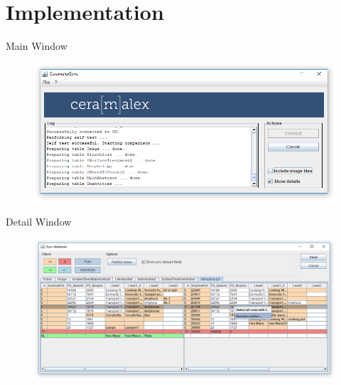 \documentclass[xcolor=x11names, aspectratio=169,usenames,dvipsnames]{beamer}
\begin{document}
\section{Implementation}

\begin{frame}{Main Window}
\begin{figure}
	\includegraphics[width=\linewidth]{img/main}
\end{figure}
\end{frame}

\begin{frame}{Detail Window}
\begin{figure}
	\includegraphics[width=\linewidth]{img/diff}
\end{figure}
\end{frame}
\end{document}
